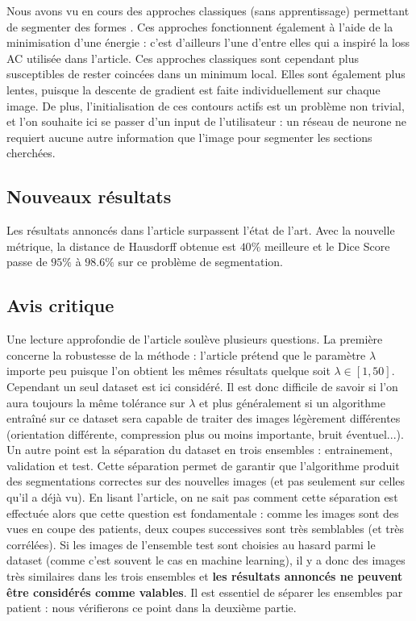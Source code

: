 \documentclass{article}
\begin{document}
Nous avons vu en cours des approches classiques (sans apprentissage) permettant de segmenter des formes \cite{findingclosed} \cite{brainseg} \cite{finsler} \cite{globalmin}. Ces approches fonctionnent également à l'aide de la minimisation d'une énergie : c'est d'ailleurs l'une d'entre elles \cite{globalmin} qui a inspiré la loss AC utilisée dans l'article. Ces approches classiques sont cependant plus susceptibles de rester coincées dans un minimum local. Elles sont également plus lentes, puisque la descente de gradient est faite individuellement sur chaque image. De plus, l'initialisation de ces contours actifs est un problème non trivial, et l'on souhaite ici se passer d'un input de l'utilisateur : un réseau de neurone ne requiert aucune autre information que l'image pour segmenter les sections cherchées. 


\subsection{Nouveaux résultats}

Les résultats annoncés dans l'article surpassent l'état de l'art. Avec la nouvelle métrique, la distance de Hausdorff obtenue est $40\%$ meilleure et le Dice Score passe de $95\%$ à $98.6\%$ sur ce problème de segmentation.

\subsection{Avis critique}

Une lecture approfondie de l'article soulève plusieurs questions. La première concerne la robustesse de la méthode : l'article prétend que le paramètre $\lambda$ importe peu puisque l'on obtient les mêmes résultats quelque soit $\lambda \in [1, 50]$. Cependant un seul dataset est ici considéré. Il est donc difficile de savoir si l'on aura toujours la même tolérance sur $\lambda$ et plus généralement si un algorithme entraîné sur ce dataset sera capable de traiter des images légèrement différentes (orientation différente, compression plus ou moins importante, bruit éventuel...).  \\

Un autre point est la séparation du dataset en trois ensembles : entrainement, validation et test. Cette séparation permet de garantir que l'algorithme produit des segmentations correctes sur des nouvelles images (et pas seulement sur celles qu'il a déjà vu). En lisant l'article, on ne sait pas comment cette séparation est effectuée alors que cette question est fondamentale : comme les images sont des vues en coupe des patients, deux coupes successives sont très semblables (et très corrélées). Si les images de l'ensemble test sont choisies au hasard parmi le dataset (comme c'est souvent le cas en machine learning), il y a donc des images très similaires dans les trois ensembles et \textbf{les résultats annoncés ne peuvent être considérés comme valables}. Il est essentiel de séparer les ensembles par patient : nous vérifierons ce point dans la deuxième partie. \\
\end{document}
